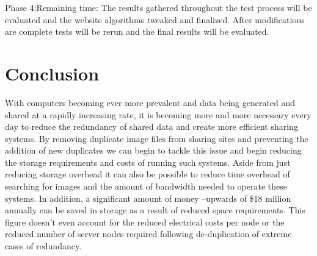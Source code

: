 \documentclass[11pt]{article}
\begin{document}
Phase 4:Remaining time: The results gathered throughout the test process will be evaluated and
the website algorithms tweaked and finalized. After modifications are complete tests will be rerun and the
final results will be evaluated.
\vspace*{-.1in}
\section{Conclusion}
\label{sec:conclusion}
\vspace*{-.1in}


With computers becoming ever more prevalent and data being generated and shared at a rapidly increasing rate, it is becoming more and more necessary every day to reduce the redundancy of shared data and create more efficient sharing systems. By removing duplicate image files from sharing sites and preventing the addition of new duplicates we can begin to tackle this issue and begin reducing the storage requirements and costs of running such systems. Aside from just reducing storage overhead it can also be possible to reduce time overhead of searching for images and the amount of bandwidth needed to operate these systems. In addition, a significant amount of money --upwards of \$18 million annually can be saved in storage as a result of reduced space requirements. This figure doesn't even account for the reduced electrical costs per node or the reduced number of server nodes required following de-duplication of extreme cases of redundancy.

\newpage
\nocite{*}


\end{document}
